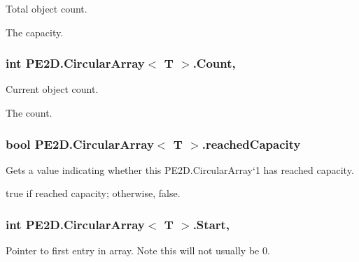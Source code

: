 Total object count. 

The capacity.\hypertarget{class_p_e2_d_1_1_circular_array_a7719268e9e7c8ae1c7e738d6b1e8b56f}{}
\subsubsection[{Count}]{\setlength{\rightskip}{0pt plus 5cm}int {\bf P\+E2\+D.\+Circular\+Array}$<$ T $>$.Count\hspace{0.3cm}{\ttfamily [get]}, {\ttfamily [set]}}\label{class_p_e2_d_1_1_circular_array_a7719268e9e7c8ae1c7e738d6b1e8b56f}


Current object count. 

The count.\hypertarget{class_p_e2_d_1_1_circular_array_a570cb7b0d5c6a0e5975ec498c6b01603}{}
\subsubsection[{reached\+Capacity}]{\setlength{\rightskip}{0pt plus 5cm}bool {\bf P\+E2\+D.\+Circular\+Array}$<$ T $>$.reached\+Capacity\hspace{0.3cm}{\ttfamily [get]}}\label{class_p_e2_d_1_1_circular_array_a570cb7b0d5c6a0e5975ec498c6b01603}


Gets a value indicating whether this P\+E2\+D.\+Circular\+Array`1 has reached capacity. 

{\ttfamily true} if reached capacity; otherwise, {\ttfamily false}.\hypertarget{class_p_e2_d_1_1_circular_array_a120928cf093724ec2a4edef5c2424469}{}
\subsubsection[{Start}]{\setlength{\rightskip}{0pt plus 5cm}int {\bf P\+E2\+D.\+Circular\+Array}$<$ T $>$.Start\hspace{0.3cm}{\ttfamily [get]}, {\ttfamily [set]}}\label{class_p_e2_d_1_1_circular_array_a120928cf093724ec2a4edef5c2424469}


Pointer to first entry in array. Note this will not usually be 0. 

